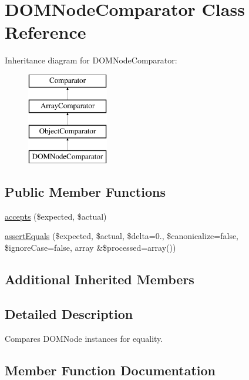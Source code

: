 \hypertarget{class_sebastian_bergmann_1_1_comparator_1_1_d_o_m_node_comparator}{}\section{D\+O\+M\+Node\+Comparator Class Reference}
\label{class_sebastian_bergmann_1_1_comparator_1_1_d_o_m_node_comparator}
Inheritance diagram for D\+O\+M\+Node\+Comparator\+:\begin{figure}[H]
\begin{center}
\leavevmode
\includegraphics[height=4.000000cm]{class_sebastian_bergmann_1_1_comparator_1_1_d_o_m_node_comparator}
\end{center}
\end{figure}
\subsection*{Public Member Functions}
\begin{DoxyCompactItemize}
\item 
\mbox{\hyperlink{class_sebastian_bergmann_1_1_comparator_1_1_d_o_m_node_comparator_ae9bdf0cba02ce3470169280656cdeb84}{accepts}} (\$expected, \$actual)
\item 
\mbox{\hyperlink{class_sebastian_bergmann_1_1_comparator_1_1_d_o_m_node_comparator_a85a7369896910cf1d55e31d477c29f1e}{assert\+Equals}} (\$expected, \$actual, \$delta=0., \$canonicalize=false, \$ignore\+Case=false, array \&\$processed=array())
\end{DoxyCompactItemize}
\subsection*{Additional Inherited Members}


\subsection{Detailed Description}
Compares D\+O\+M\+Node instances for equality. 

\subsection{Member Function Documentation}
\mbox{\label{class_sebastian_bergmann_1_1_comparator_1_1_d_o_m_node_comparator_ae9bdf0cba02ce3470169280656cdeb84}} 
